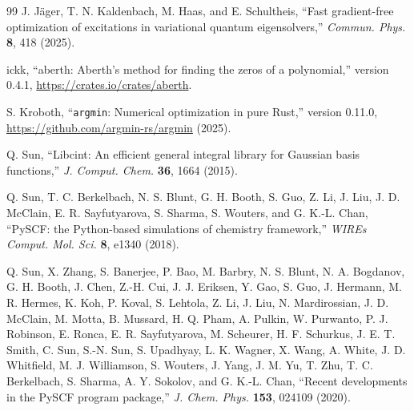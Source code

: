 \documentclass[
 reprint,
 amsmath,amssymb,
 aps,
 physrev,
]{revtex4-2}
\begin{document}
\begin{thebibliography}{99}
    J. J{\"a}ger, T. N. Kaldenbach, M. Haas, and E. Schultheis, ``Fast gradient-free optimization of excitations in variational quantum eigensolvers,'' \textit{Commun. Phys.} \textbf{8}, 418 (2025).

    ickk,
    ``aberth: Aberth's method for finding the zeros of a polynomial,''
    version 0.4.1,
    \url{https://crates.io/crates/aberth}.

    S. Kroboth, ``\texttt{argmin}: Numerical optimization in pure Rust,'' version 0.11.0, \url{https://github.com/argmin-rs/argmin} (2025).

    Q. Sun, ``Libcint: An efficient general integral library for Gaussian basis functions,'' \textit{J. Comput. Chem.} \textbf{36}, 1664 (2015).

    Q. Sun, T. C. Berkelbach, N. S. Blunt, G. H. Booth, S. Guo, Z. Li, J. Liu, J. D. McClain, E. R. Sayfutyarova, S. Sharma, S. Wouters, and G. K.-L. Chan, ``PySCF: the Python-based simulations of chemistry framework,'' \textit{WIREs Comput. Mol. Sci.} \textbf{8}, e1340 (2018).

    Q. Sun, X. Zhang, S. Banerjee, P. Bao, M. Barbry, N. S. Blunt, N. A. Bogdanov, G. H. Booth, J. Chen, Z.-H. Cui, J. J. Eriksen, Y. Gao, S. Guo, J. Hermann, M. R. Hermes, K. Koh, P. Koval, S. Lehtola, Z. Li, J. Liu, N. Mardirossian, J. D. McClain, M. Motta, B. Mussard, H. Q. Pham, A. Pulkin, W. Purwanto, P. J. Robinson, E. Ronca, E. R. Sayfutyarova, M. Scheurer, H. F. Schurkus, J. E. T. Smith, C. Sun, S.-N. Sun, S. Upadhyay, L. K. Wagner, X. Wang, A. White, J. D. Whitfield, M. J. Williamson, S. Wouters, J. Yang, J. M. Yu, T. Zhu, T. C. Berkelbach, S. Sharma, A. Y. Sokolov, and G. K.-L. Chan, ``Recent developments in the PySCF program package,'' \textit{J. Chem. Phys.} \textbf{153}, 024109 (2020).

\end{thebibliography}
\end{document}

